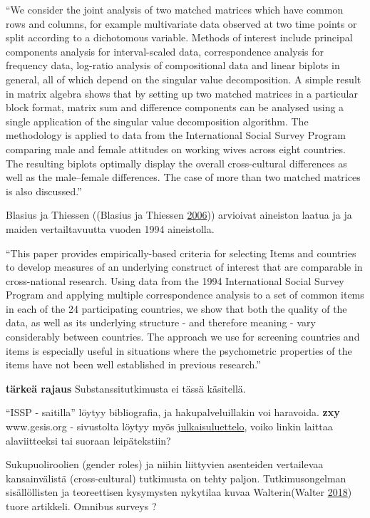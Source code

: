 \documentclass[
  finnish,
]{book}
\begin{document}
``We consider the joint analysis of two matched matrices which have
common rows and columns, for example multivariate data observed at two
time points or split according to a dichotomous variable. Methods of
interest include principal components analysis for interval-scaled data,
correspondence analysis for frequency data, log-ratio analysis of
compositional data and linear biplots in general, all of which depend on
the singular value decomposition. A simple result in matrix algebra
shows that by setting up two matched matrices in a particular block
format, matrix sum and difference components can be analysed using a
single application of the singular value decomposition algorithm. The
methodology is applied to data from the International Social Survey
Program comparing male and female attitudes on working wives across
eight countries. The resulting biplots optimally display the overall
cross-cultural differences as well as the male--female differences. The
case of more than two matched matrices is also discussed.''

Blasius ja Thiessen ((Blasius ja Thiessen
\protect\hyperlink{ref-RefWorks:doc:5b15542ee4b0e2616bc42dca}{2006}))
arvioivat aineiston laatua ja ja maiden vertailtavuutta vuoden 1994
aineistolla.

``This paper provides empirically-based criteria for selecting Items and
countries to develop measures of an underlying construct of interest
that are comparable in cross-national research. Using data from the 1994
International Social Survey Program and applying multiple correspondence
analysis to a set of common items in each of the 24 participating
countries, we show that both the quality of the data, as well as its
underlying structure - and therefore meaning - vary considerably between
countries. The approach we use for screening countries and items is
especially useful in situations where the psychometric properties of the
items have not been well established in previous research.''

\textbf{tärkeä rajaus} Substanssitutkimusta ei tässä käsitellä.

``ISSP - saitilla'' löytyy bibliografia, ja hakupalveluillakin voi
haravoida. \textbf{zxy} www.gesis.org - sivustolta löytyy myös
\href{https://search.gesis.org/research_data/ZA5900}{julkaisuluettelo},
voiko linkin laittaa alaviitteeksi tai suoraan leipätekstiin?

Sukupuoliroolien (gender roles) ja niihin liittyvien asenteiden
vertailevaa kansainvälistä (cross-cultural) tutkimusta on tehty paljon.
Tutkimusongelman sisällöllisten ja teoreettisen kysymysten nykytilaa
kuvaa Walterin(Walter
\protect\hyperlink{ref-RefWorks:doc:5bd08fb6e4b05c5447c9a9f9}{2018})
tuore artikkeli. Omnibus surveys ?
\end{document}
